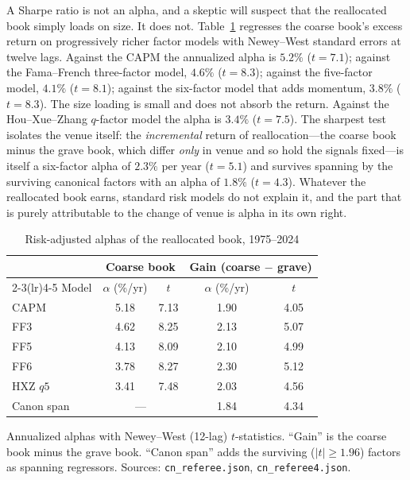 \documentclass[12pt]{article}
\theoremstyle{plain}
\theoremstyle{definition}
\begin{document}
A Sharpe ratio is not an alpha, and a skeptic will suspect that the reallocated
book simply loads on size. It does not. Table~\ref{tab:alpha} regresses the
coarse book's excess return on progressively richer factor models with
Newey--West \citeyearpar{NeweyWest1987} standard errors at twelve lags. Against
the CAPM the annualized alpha is $5.2\%$ ($t=7.1$); against the Fama--French
three-factor model, $4.6\%$ ($t=8.3$); against the five-factor model, $4.1\%$
($t=8.1$); against the six-factor model that adds momentum, $3.8\%$ ($t=8.3$).
The size loading is small and does not absorb the return. Against the
Hou--Xue--Zhang $q$-factor model the alpha is $3.4\%$ ($t=7.5$). The sharpest
test isolates the venue itself: the \emph{incremental} return of
reallocation---the coarse book minus the grave
book, which differ \emph{only} in venue and so hold the signals fixed---is itself
a six-factor alpha of $2.3\%$ per year ($t=5.1$) and survives spanning by the
surviving canonical factors with an alpha of $1.8\%$ ($t=4.3$). Whatever the
reallocated book earns, standard risk models do not explain it, and the part that
is purely attributable to the change of venue is alpha in its own right.

\begin{table}[t]
\centering
\caption{Risk-adjusted alphas of the reallocated book, 1975--2024}
\label{tab:alpha}
\begin{threeparttable}
\begin{tabular}{lcccc}
\toprule
& \multicolumn{2}{c}{Coarse book} & \multicolumn{2}{c}{Gain (coarse $-$ grave)}\\
\cmidrule(lr){2-3}\cmidrule(lr){4-5}
Model & $\alpha$ (\%/yr) & $t$ & $\alpha$ (\%/yr) & $t$ \\
\midrule
CAPM        & 5.18 & 7.13 & 1.90 & 4.05 \\
FF3         & 4.62 & 8.25 & 2.13 & 5.07 \\
FF5         & 4.13 & 8.09 & 2.10 & 4.99 \\
FF6         & 3.78 & 8.27 & 2.30 & 5.12 \\
HXZ $q5$    & 3.41 & 7.48 & 2.03 & 4.56 \\
Canon span  & \multicolumn{2}{c}{---} & 1.84 & 4.34 \\
\bottomrule
\end{tabular}
\begin{tablenotes}\footnotesize
\item Annualized alphas with Newey--West (12-lag) $t$-statistics. ``Gain'' is the
coarse book minus the grave book. ``Canon span'' adds the surviving ($|t|\ge
1.96$) factors as spanning regressors. Sources: \texttt{cn\_referee.json},
\texttt{cn\_referee4.json}.
\end{tablenotes}
\end{threeparttable}
\end{table}
\end{document}

